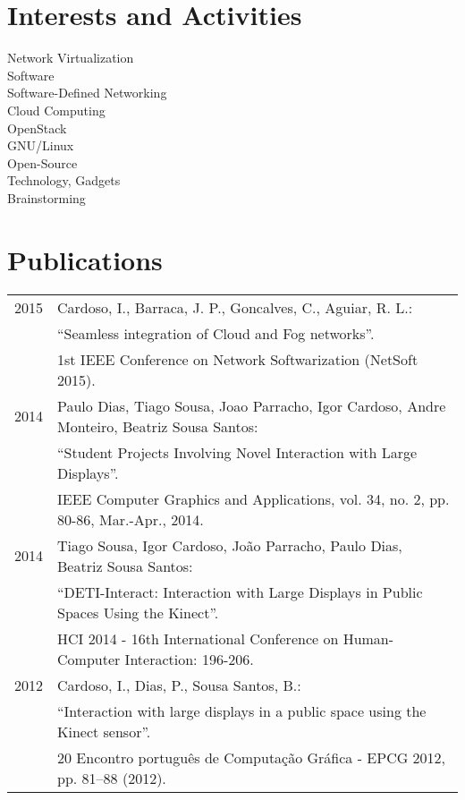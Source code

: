 \documentclass[letter,10pt]{article} %
\begin{document}

\section{Interests and Activities}
Network Virtualization\\
Software\\
Software-Defined Networking\\
Cloud Computing\\
OpenStack\\
GNU/Linux\\
Open-Source\\
Technology, Gadgets\\
Brainstorming\\


\section{Publications}
\label{section:publications}
\begin{tabular}{rl}
\textsc{2015} & Cardoso, I., Barraca, J. P., Goncalves, C., Aguiar, R. L.: \\
& ``Seamless integration of Cloud and Fog networks''. \\
& 1st IEEE Conference on Network Softwarization (NetSoft 2015). \normalsize\\
\textsc{2014} & Paulo Dias, Tiago Sousa, Joao Parracho, Igor Cardoso, Andre Monteiro, Beatriz Sousa Santos: \\
& ``Student Projects Involving Novel Interaction with Large Displays''. \\
& IEEE Computer Graphics and Applications, vol. 34, no. 2, pp. 80-86, Mar.-Apr., 2014. \normalsize\\
\textsc{2014} & Tiago Sousa, Igor Cardoso, João Parracho, Paulo Dias, Beatriz Sousa Santos: \\
& ``DETI-Interact: Interaction with Large Displays in Public Spaces Using the Kinect''. \\
& HCI 2014 - 16th International Conference on Human-Computer Interaction: 196-206. \normalsize\\
\textsc{2012} & Cardoso, I., Dias, P., Sousa Santos, B.: \\
& ``Interaction with large displays in a public space using the Kinect sensor''. \\
& 20 Encontro português de Computação Gráfica - EPCG 2012, pp. 81–88 (2012).
\end{tabular} \\
\end{document}
